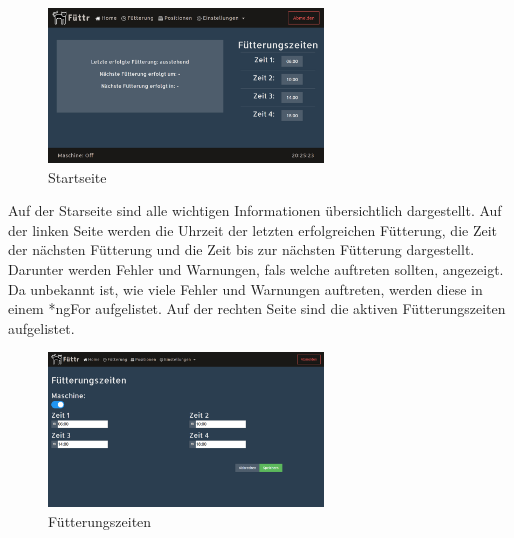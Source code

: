 \begin{figure}
\vspace{-10pt}
  \begin{center}
    \includegraphics[width=0.65\textwidth]{Bilder/Greistorfer/Home}
  \end{center}
  \caption{Startseite}
  \label{Startseite}
  \vspace{-10pt}
\end{figure}

Auf der Starseite sind alle wichtigen Informationen übersichtlich dargestellt. Auf der linken Seite werden die Uhrzeit der letzten erfolgreichen Fütterung, die Zeit der nächsten Fütterung und die Zeit bis zur nächsten Fütterung dargestellt. Darunter werden Fehler und Warnungen, fals welche auftreten sollten, angezeigt. Da unbekannt ist, wie viele Fehler und Warnungen auftreten, werden diese in einem *ngFor aufgelistet. Auf der rechten Seite sind die aktiven Fütterungszeiten aufgelistet. \\

\begin{figure}
\vspace{-10pt}
  \begin{center}
    \includegraphics[width=0.65\textwidth]{Bilder/Greistorfer/Fuetterungszeiten}
  \end{center}
  \caption{Fütterungszeiten}
  \label{Fütterungszeiten}
  \vspace{-10pt}
\end{figure}

